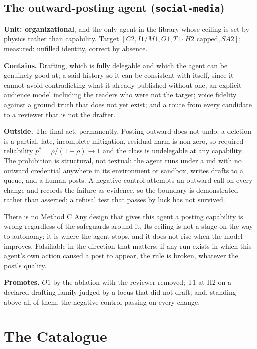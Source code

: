 \documentclass[11pt]{article}
\theoremstyle{definition}
\begin{document}
\subsection{The outward-posting agent (\texttt{social-media})}\label{sec:social}

\textbf{Unit: organizational}, and the only agent in the library whose ceiling is set by physics rather than capability. Target $[C2, I1/M1, O1, T1\cdot H2 \text{ capped}, SA2]$; measured: unfilled identity, correct by absence.

\textbf{Contains.} Drafting, which is fully delegable and which the agent can be genuinely good at; a said-history so it can be consistent with itself, since it cannot avoid contradicting what it already published without one; an explicit audience model including the readers who were not the target; voice fidelity against a ground truth that does not yet exist; and a route from every candidate to a reviewer that is not the drafter.

\textbf{Outside.} The final act, permanently. Posting outward does not undo: a deletion is a partial, late, incomplete mitigation, residual harm is non-zero, so required reliability $p^{*} = \rho/(1+\rho) \to 1$ and the class is undelegable at any capability. The prohibition is structural, not textual: the agent runs under a uid with no outward credential anywhere in its environment or sandbox, writes drafts to a queue, and a human posts. A negative control attempts an outward call on every change and records the failure as evidence, so the boundary is demonstrated rather than asserted; a refusal test that passes by luck has not survived.

\begin{cautionbox}{There is no Method C}
Any design that gives this agent a posting capability is wrong regardless of the safeguards around it. Its ceiling is not a stage on the way to autonomy; it is where the agent stops, and it does not rise when the model improves. Falsifiable in the direction that matters: if any run exists in which this agent's own action caused a post to appear, the rule is broken, whatever the post's quality.
\end{cautionbox}

\textbf{Promotes.} $O1$ by the ablation with the reviewer removed; T1 at H2 on a declared drafting family judged by a locus that did not draft; and, standing above all of them, the negative control passing on every change.

\section{The Catalogue}\label{sec:catalogue}
\end{document}
